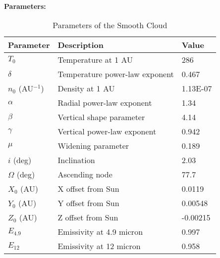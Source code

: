 \documentclass[a4paper,10pt]{article}
\begin{document}
\textbf{Parameters:}\\

\begin{table}[htbp]
\caption{Parameters of the Smooth Cloud}
\begin{tabular}{lll}
\hline
\textbf{Parameter} & \textbf{Description}           & \textbf{Value} \\ \hline
$T_0$                 & Temperature at 1 AU            & 286            \\
$\delta$              & Temperature power-law exponent & 0.467          \\
$n_0$ (AU$^{-1}$)          & Density at 1 AU                & 1.13E-07       \\
$\alpha$              & Radial power-law exponent      & 1.34           \\
$\beta$               & Vertical shape parameter       & 4.14           \\
$\gamma$              & Vertical power-law exponent    & 0.942          \\
$\mu$                 & Widening parameter             & 0.189          \\
$i$ (deg)            & Inclination                    & 2.03           \\
$\Omega$ (deg)        & Ascending node                 & 77.7           \\
$X_0$ (AU)            & X offset from Sun              & 0.0119         \\
$Y_0$ (AU)            & Y offset from Sun              & 0.00548        \\
$Z_0$ (AU)            & Z offset from Sun              & -0.00215       \\
$E_{4.9}$               & Emissivity at 4.9 micron       & 0.997          \\
$E_{12}$                & Emissivity at 12 micron        & 0.958          \\ \hline
\end{tabular}
\end{table}
\end{document}
